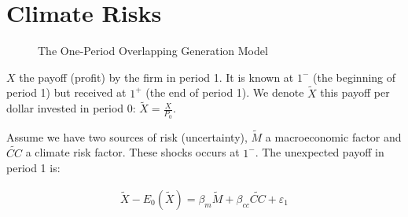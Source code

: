 \chapter{Climate Risks}

\begin{figure}[htbp]
    \centering
    \caption{The One-Period Overlapping Generation Model}
    \label{fig:fig01}
\end{figure}

$X$ the payoff (profit) by the
firm in period 1. It is known at $1^{-}$ (the beginning
of period 1) but received at $1^{+}$ (the end of period 1).
We denote $\tilde{X}$ this payoff per dollar 
invested in period 0: $\tilde{X} = \frac{X}{P_0}$.

Assume we have two sources of risk (uncertainty), $\tilde{M}$
a macroeconomic factor and $\tilde{CC}$ a climate risk factor.
These shocks occurs at $1^{-}$.
The unexpected payoff in period 1 is:

\begin{equation}
    \begin{aligned}
    \tilde{X} - E_0(\tilde{X}) = \beta_m \tilde{M} + \beta_{cc} \tilde{CC} + \varepsilon_1
    \end{aligned}
\end{equation}

